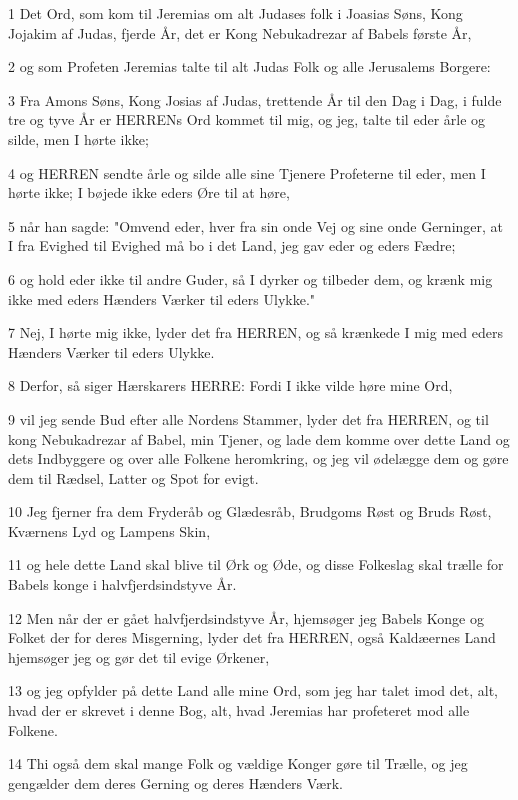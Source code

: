 \par 1 Det Ord, som kom til Jeremias om alt Judases folk i Joasias Søns, Kong Jojakim af Judas, fjerde År, det er Kong Nebukadrezar af Babels første År,
\par 2 og som Profeten Jeremias talte til alt Judas Folk og alle Jerusalems Borgere:
\par 3 Fra Amons Søns, Kong Josias af Judas, trettende År til den Dag i Dag, i fulde tre og tyve År er HERRENs Ord kommet til mig, og jeg, talte til eder årle og silde, men I hørte ikke;
\par 4 og HERREN sendte årle og silde alle sine Tjenere Profeterne til eder, men I hørte ikke; I bøjede ikke eders Øre til at høre,
\par 5 når han sagde: "Omvend eder, hver fra sin onde Vej og sine onde Gerninger, at I fra Evighed til Evighed må bo i det Land, jeg gav eder og eders Fædre;
\par 6 og hold eder ikke til andre Guder, så I dyrker og tilbeder dem, og krænk mig ikke med eders Hænders Værker til eders Ulykke."
\par 7 Nej, I hørte mig ikke, lyder det fra HERREN, og så krænkede I mig med eders Hænders Værker til eders Ulykke.
\par 8 Derfor, så siger Hærskarers HERRE: Fordi I ikke vilde høre mine Ord,
\par 9 vil jeg sende Bud efter alle Nordens Stammer, lyder det fra HERREN, og til kong Nebukadrezar af Babel, min Tjener, og lade dem komme over dette Land og dets Indbyggere og over alle Folkene heromkring, og jeg vil ødelægge dem og gøre dem til Rædsel, Latter og Spot for evigt.
\par 10 Jeg fjerner fra dem Fryderåb og Glædesråb, Brudgoms Røst og Bruds Røst, Kværnens Lyd og Lampens Skin,
\par 11 og hele dette Land skal blive til Ørk og Øde, og disse Folkeslag skal trælle for Babels konge i halvfjerdsindstyve År.
\par 12 Men når der er gået halvfjerdsindstyve År, hjemsøger jeg Babels Konge og Folket der for deres Misgerning, lyder det fra HERREN, også Kaldæernes Land hjemsøger jeg og gør det til evige Ørkener,
\par 13 og jeg opfylder på dette Land alle mine Ord, som jeg har talet imod det, alt, hvad der er skrevet i denne Bog, alt, hvad Jeremias har profeteret mod alle Folkene.
\par 14 Thi også dem skal mange Folk og vældige Konger gøre til Trælle, og jeg gengælder dem deres Gerning og deres Hænders Værk.

